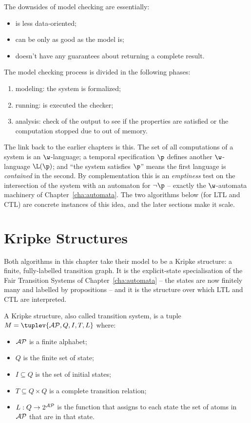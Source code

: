 \documentclass[oneside]{academica}
\begin{document}
The downsides of model checking are essentially:
\begin{itemize}
  \item is less data-oriented;
  \item can be only as good as the model is;
  \item doesn't have any guarantees about returning a complete result.
\end{itemize}

The model checking process is divided in the following phases:
\begin{enumerate}
  \item modeling: the system is formalized;
  \item running: is executed the checker;
  \item analysis: check of the output to see if the properties are satisfied or the computation stopped due to out of memory.
\end{enumerate}

The link back to the earlier chapters is this. The set of all computations of a system is an $\w$-language; a temporal specification $\p$ defines another $\w$-language $\L(\p)$; and ``the system satisfies $\p$'' means the first language is \emph{contained} in the second. By complementation this is an \emph{emptiness} test on the intersection of the system with an automaton for $\neg\p$ -- exactly the $\w$-automata machinery of Chapter~\ref{cha:automata}. The two algorithms below (for LTL and CTL) are concrete instances of this idea, and the later sections make it scale.

\section{Kripke Structures}

Both algorithms in this chapter take their model to be a Kripke structure: a finite, fully-labelled transition graph. It is the explicit-state specialisation of the Fair Transition Systems of Chapter~\ref{cha:automata} -- the states are now finitely many and labelled by propositions -- and it is the structure over which LTL and CTL are interpreted.

\begin{definition*}
  A Kripke structure, also called transition system, is a tuple $M = \tuplev{\AP,Q,I,T,L}$ where:
  \begin{itemize}
    \item ${\mathcal{AP}}$ is a finite alphabet;
    \item $Q$ is the finite set of state;
    \item $I \subseteq Q$ is the set of initial states;
    \item $T \subseteq Q \times Q$ is a complete transition relation;
    \item $L: Q \to 2^{{\mathcal{AP}}}$ is the function that assigns to each state the set of atoms in ${\mathcal{AP}}$ that are \true in that state.
  \end{itemize}
\end{definition*}
\end{document}
